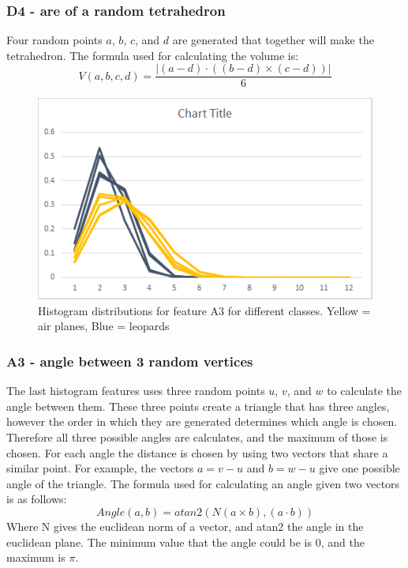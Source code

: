 \documentclass{bigdata}
\begin{document}
\subsubsection{D4 - are of a random tetrahedron}
Four random points $a$, $b$, $c$, and $d$ are generated that together will make the tetrahedron. The formula used for calculating the volume is:
\begin{equation}
V(a,b,c,d) = \frac{|(a - d) \cdot ((b - d) \times (c - d))|}{6}
\end{equation}

\begin{figure}[h!]
    \includegraphics[width=\linewidth]{Pictures/Part3/D4.png}
    \caption{Histogram distributions for feature A3 for different classes. Yellow = air planes, Blue = leopards}
  \label{fig:eccentricity}
\end{figure}

\subsubsection{A3 - angle between 3 random vertices}
The last histogram features uses three random points $u$, $v$, and $w$ to calculate the angle between them. These three points create a triangle that has three angles, however the order in which they are generated determines which angle is chosen. Therefore all three possible angles are calculates, and the maximum of those is chosen. For each angle the distance is chosen by using two vectors that share a similar point. For example, the vectors $a = v-u$ and $b = w-u$ give one possible angle of the triangle. The formula used for calculating an angle given two vectors is as follows:
\begin{equation}
Angle(a,b) = atan2(N(a \times b), (a \cdot b))
\end{equation}
Where N gives the euclidean norm of a vector, and atan2 the angle in the euclidean plane. The minimum value that the angle could be is 0, and the maximum is $\pi$.
\end{document}
